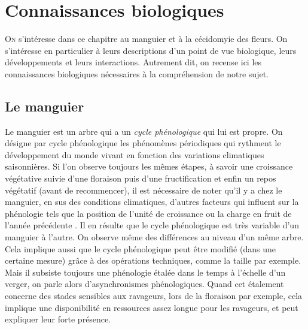 \chapter{Connaissances biologiques} 

\lettrine{O}{n} s'intéresse dans ce chapitre au manguier et à la cécidomyie des fleurs.
On s'intéresse en particulier à leurs descriptions d'un point de vue biologique, leurs développements et leurs interactions.
Autrement dit, on recense ici les connaissances biologiques nécessaires à la compréhension de notre sujet.


\section{Le manguier}

Le manguier est un arbre qui a un \emph{cycle phénologique} qui lui est propre.
On désigne par cycle phénologique les phénomènes périodiques qui rythment le développement du monde vivant en fonction des variations climatiques saisonnières.
Si l'on observe toujours les mêmes étapes, à savoir une croissance végétative suivie d'une floraison puis d'une fructification et enfin un repos végétatif (avant de recommencer),
il est nécessaire de noter qu'il y a chez le manguier, en sus des conditions climatiques, d'autres facteurs qui influent sur la phénologie tels que la position de l'unité de croissance ou la charge en fruit de l'année précédente \citep{magne2004effet, normand2009axis}.
Il en résulte que le cycle phénologique est très variable d'un manguier à l'autre.
On observe même des différences au niveau d'un même arbre.
Cela implique aussi que le cycle phénologique peut être modifié (dans une certaine mesure) grâce à des opérations techniques, comme la taille par exemple.
Mais il subsiste toujours une phénologie étalée dans le temps à l'échelle d'un verger, on parle alors d'asynchronismes phénologiques.
Quand cet étalement concerne des stades sensibles aux ravageurs, lors de la floraison par exemple, cela implique une disponibilité en ressources assez longue pour les ravageurs, et peut expliquer leur forte présence.

